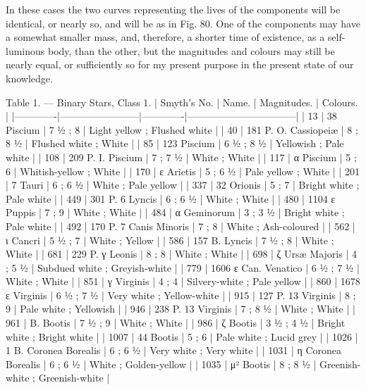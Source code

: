 \documentclass[a4paper, 12pt, oneside, polutonikogreek, english]{article}
\begin{document}
In these cases the two curves representing the lives of the components will be identical, or nearly so, and will be as in Fig. 80. One of the components may have a somewhat smaller mass, and, therefore, a shorter time of existence, as a self-luminous body, than the other, but the magnitudes and colours may still be nearly equal, or sufficiently so for my present purpose in the present state of our knowledge.

Table 1. --- Binary Stars, Class 1. 
| Smyth’s No. | Name.         | Magnitudes. | Colours.            |
|-------------|------------------------|-------------|---------------------------------|
| 13     | 38 Piscium       | 7 ½ ; 8   | Light yellow ; Flushed white  |
| 40     | 181 P. O. Cassiopeiæ  | 8 ; 8 ½   | Flushed white ; White      |
| 85     | 123 Piscium      | 6 ½ ; 8 ½  | Yellowish ; Pale white     |
| 108     | 209 P. I. Piscium   | 7 ; 7 ½   | White ; White          |
| 117     | α Piscium       | 5 ; 6    | Whitish-yellow ; White     |
| 170     | ε Arietis       | 5 ; 6 ½   | Pale yellow ; White       |
| 201     | 7 Tauri        | 6 ; 6 ½   | White ; Pale yellow       |
| 337     | 32 Orionis       | 5 ; 7    | Bright white ; Pale white    |
| 449     | 301 P. 6 Lyncis    | 6 ; 6 ½   | White ; White          |
| 480     | 1104 ε Puppis     | 7 ; 9    | White ; White          |
| 484     | α Geminorum      | 3 ; 3 ½   | Bright white ; Pale white    |
| 492     | 170 P. 7 Canis Minoris | 7 ; 8    | White ; Ash-coloured      |
| 562     | ι Cancri        | 5 ½ ; 7   | White ; Yellow         |
| 586     | 157 B. Lyncis     | 7 ½ ; 8   | White ; White          |
| 681     | 229 P. γ Leonis    | 8 ; 8    | White ; White          |
| 698     | ζ Ursæ Majoris     | 4 ; 5 ½   | Subdued white ; Greyish-white  |
| 779     | 1606 ε Can. Venatico  | 6 ½ ; 7 ½  | White ; White          |
| 851     | γ Virginis       | 4 ; 4    | Silvery-white ; Pale yellow   |
| 860     | 1678 ε Virginis    | 6 ½ ; 7 ½  | Very white ; Yellow-white    |
| 915     | 127 P. 13 Virginis   | 8 ; 9    | Pale white ; Yellowish     |
| 946     | 238 P. 13 Virginis   | 7 ; 8 ½   | White ; White          |
| 961     | B. Bootis       | 7 ½ ; 9   | White ; White          |
| 986     | ζ Bootis        | 3 ½ ; 4 ½  | Bright white ; Bright white   |
| 1007    | 44 Bootis       | 5 ; 6    | Pale white ; Lucid grey     |
| 1026    | 1 B. Coronea Borealis | 6 ; 6 ½   | Very white ; Very white     |
| 1031    | η Coronea Borealis   | 6 ; 6 ½   | White ; Golden-yellow      |
| 1035    | μ² Bootis       | 8 ; 8 ½   | Greenish-white ; Greenish-white |
\end{document}
